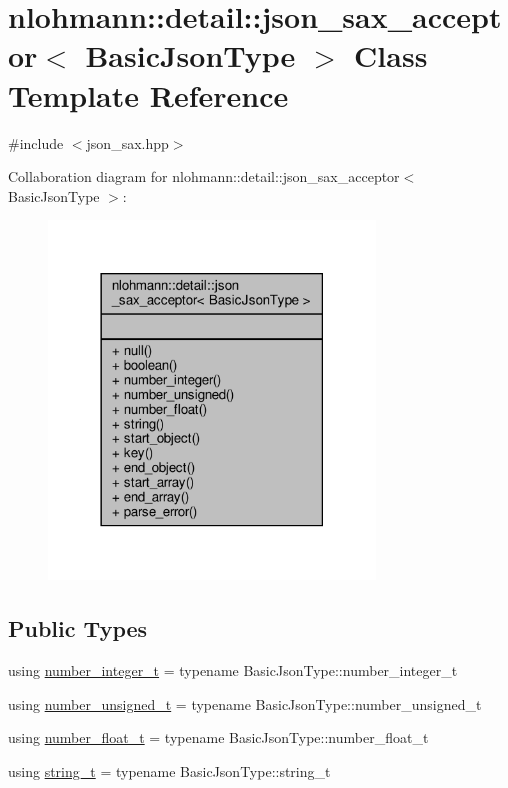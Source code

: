 \hypertarget{classnlohmann_1_1detail_1_1json__sax__acceptor}{}\section{nlohmann\+:\+:detail\+:\+:json\+\_\+sax\+\_\+acceptor$<$ Basic\+Json\+Type $>$ Class Template Reference}
\label{classnlohmann_1_1detail_1_1json__sax__acceptor}


{\ttfamily \#include $<$json\+\_\+sax.\+hpp$>$}



Collaboration diagram for nlohmann\+:\+:detail\+:\+:json\+\_\+sax\+\_\+acceptor$<$ Basic\+Json\+Type $>$\+:
\nopagebreak
\begin{figure}[H]
\begin{center}
\leavevmode
\includegraphics[width=246pt]{classnlohmann_1_1detail_1_1json__sax__acceptor__coll__graph}
\end{center}
\end{figure}
\subsection*{Public Types}
\begin{DoxyCompactItemize}
\item 
using \hyperlink{classnlohmann_1_1detail_1_1json__sax__acceptor_a41876b17c0e8bdb55580eaf5e4e2ded8}{number\+\_\+integer\+\_\+t} = typename Basic\+Json\+Type\+::number\+\_\+integer\+\_\+t
\item 
using \hyperlink{classnlohmann_1_1detail_1_1json__sax__acceptor_ae07454608ea6f3cfb765f95e3c850043}{number\+\_\+unsigned\+\_\+t} = typename Basic\+Json\+Type\+::number\+\_\+unsigned\+\_\+t
\item 
using \hyperlink{classnlohmann_1_1detail_1_1json__sax__acceptor_a5502f483fc60a1bcd73e0e46b6ab36e4}{number\+\_\+float\+\_\+t} = typename Basic\+Json\+Type\+::number\+\_\+float\+\_\+t
\item 
using \hyperlink{classnlohmann_1_1detail_1_1json__sax__acceptor_a3a8078bbf865ec355106f6048241609a}{string\+\_\+t} = typename Basic\+Json\+Type\+::string\+\_\+t
\end{DoxyCompactItemize}
